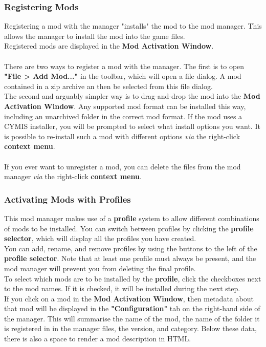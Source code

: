 \documentclass{article}
\begin{document}
\subsubsection{Registering Mods}
Registering a mod with the manager "installs" the mod to the mod manager. This allows the manager to install the mod into the game files.\\
Registered mods are displayed in the \textbf{Mod Activation Window}.\\\\
There are two ways to register a mod with the manager. The first is to open \textbf{"File > Add Mod..."} in the toolbar, which will open a file dialog. A mod contained in a zip archive an then be selected from this file dialog.\\
The second and arguably simpler way is to drag-and-drop the mod into the \textbf{Mod Activation Window}. Any supported mod format can be installed this way, including an unarchived folder in the correct mod format.
If the mod uses a CYMIS installer, you will be prompted to select what install options you want. It is possible to re-install such a mod with different options \textit{via} the right-click \textbf{context menu}.\\\\
If you ever want to unregister a mod, you can delete the files from the mod manager \textit{via} the right-click \textbf{context menu}.

\subsubsection{Activating Mods with Profiles}
This mod manager makes use of a \textbf{profile} system to allow different combinations of mods to be installed. You can switch between profiles by clicking the \textbf{profile selector}, which will display all the profiles you have created.\\
You can add, rename, and remove profiles by using the buttons to the left of the \textbf{profile selector}. Note that at least one profile must always be present, and the mod manager will prevent you from deleting the final profile.\\
To select which mods are to be installed by the \textbf{profile}, click the checkboxes next to the mod names. If it is checked, it will be installed during the next step.\\
If you click on a mod in the \textbf{Mod Activation Window}, then metadata about that mod will be displayed in the \textbf{"Configuration"} tab on the right-hand side of the manager. This will summarise the name of the mod, the name of the folder it is registered in in the manager files, the version, and category. Below these data, there is also a space to render a mod description in HTML.
\end{document}

